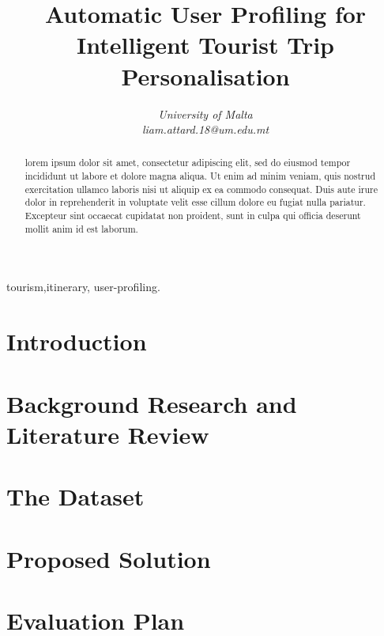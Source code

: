 \documentclass[conference]{IEEEtran}
\title{Automatic User Profiling for Intelligent Tourist Trip Personalisation}
\author{\IEEEauthorblockN{Liam Attard [0299300L] }
\IEEEauthorblockA{Department of Artificial Intelligence}
\textit{University of Malta}\\
\textit{liam.attard.18@um.edu.mt}}
\begin{document}
  \maketitle

  \begin{abstract}
    lorem ipsum dolor sit amet, consectetur adipiscing elit, sed do
    eiusmod tempor incididunt ut labore et dolore magna aliqua. Ut
    enim ad minim veniam, quis nostrud exercitation ullamco laboris
    nisi ut aliquip ex ea commodo consequat. Duis aute irure dolor in
    reprehenderit in voluptate velit esse cillum dolore eu fugiat
    nulla pariatur. Excepteur sint occaecat cupidatat non proident,
    sunt in culpa qui officia deserunt mollit anim id est laborum.
  \end{abstract}

  \begin{IEEEkeywords}
  tourism,itinerary, user-profiling.
  \end{IEEEkeywords}

  \section{Introduction}
    

  \section{Background Research and Literature Review}
    

  \section{The Dataset}
    
  
  \section{Proposed Solution}
  \label{Proposed}

  \section{Evaluation Plan}
  \label{Evaluation}

  
  
\end{document}
